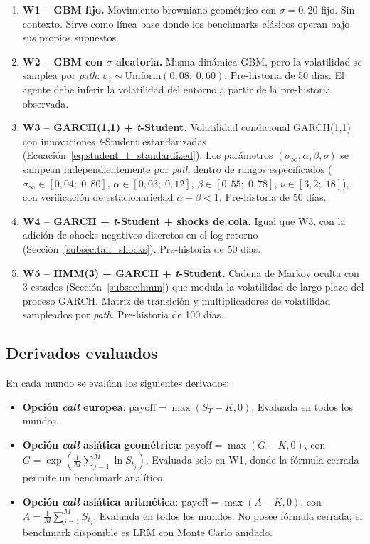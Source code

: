 \documentclass[11pt,a4paper,spanish]{article}
\numberwithin{equation}{section} %
\begin{document}
\begin{enumerate}
    \item \textbf{W1 -- GBM fijo.} Movimiento browniano geométrico con $\sigma = 0{,}20$ fijo. Sin contexto. Sirve como línea base donde los benchmarks clásicos operan bajo sus propios supuestos.

    \item \textbf{W2 -- GBM con $\sigma$ aleatoria.} Misma dinámica GBM, pero la volatilidad se samplea por \textit{path}: $\sigma_i \sim \text{Uniform}(0{,}08;\; 0{,}60)$. Pre-historia de 50 días. El agente debe inferir la volatilidad del entorno a partir de la pre-historia observada.

    \item \textbf{W3 -- GARCH(1,1) + \textit{t}-Student.} Volatilidad condicional GARCH(1,1) con innovaciones \textit{t}-Student estandarizadas (Ecuación~\ref{eq:student_t_standardized}). Los parámetros $(\sigma_\infty, \alpha, \beta, \nu)$ se sampean independientemente por \textit{path} dentro de rangos especificados ($\sigma_\infty \in [0{,}04;\; 0{,}80]$, $\alpha \in [0{,}03;\; 0{,}12]$, $\beta \in [0{,}55;\; 0{,}78]$, $\nu \in [3{,}2;\; 18]$), con verificación de estacionariedad $\alpha + \beta < 1$. Pre-historia de 50 días.

    \item \textbf{W4 -- GARCH + \textit{t}-Student + shocks de cola.} Igual que W3, con la adición de shocks negativos discretos en el log-retorno (Sección~\ref{subsec:tail_shocks}). Pre-historia de 50 días.

    \item \textbf{W5 -- HMM(3) + GARCH + \textit{t}-Student.} Cadena de Markov oculta con 3 estados (Sección~\ref{subsec:hmm}) que modula la volatilidad de largo plazo del proceso GARCH. Matriz de transición y multiplicadores de volatilidad sampleados por \textit{path}. Pre-historia de 100 días.
\end{enumerate}

\subsection{Derivados evaluados}

En cada mundo se evalúan los siguientes derivados:

\begin{itemize}
    \item \textbf{Opción \textit{call} europea}: $\text{payoff} = \max(S_T - K, 0)$. Evaluada en todos los mundos.
    \item \textbf{Opción \textit{call} asiática geométrica}: $\text{payoff} = \max(G - K, 0)$, con $G = \exp\!\left(\frac{1}{M}\sum_{j=1}^{M} \ln S_{t_j}\right)$. Evaluada solo en W1, donde la fórmula cerrada permite un benchmark analítico.
    \item \textbf{Opción \textit{call} asiática aritmética}: $\text{payoff} = \max(A - K, 0)$, con $A = \frac{1}{M}\sum_{j=1}^{M} S_{t_j}$. Evaluada en todos los mundos. No posee fórmula cerrada; el benchmark disponible es LRM con Monte Carlo anidado.
\end{itemize}
\end{document}
